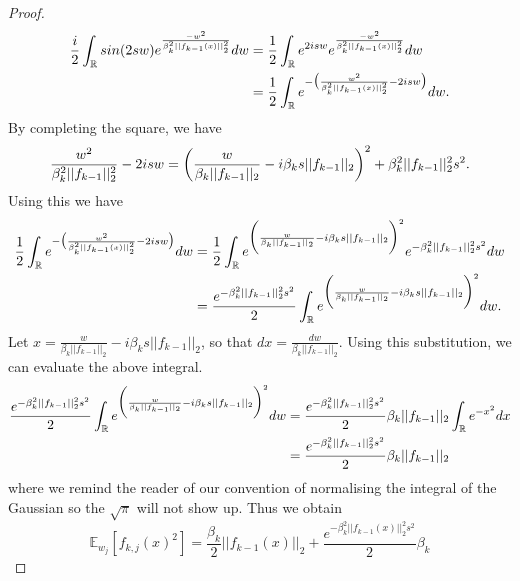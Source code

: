 \documentclass{article}
\theoremstyle{plain}
\theoremstyle{definition}
\theoremstyle{remark}
\newcommand\R{\mathbb{R}}
\begin{document}
\begin{proof}
\begin{align*}
	\frac{i}{2}\int_{\R}sin(2sw)
	e^{\frac{-w^2}{\beta_k^2\vert\vert f_{k-1}(x)\vert\vert_2^2}}dw &=
	\frac{1}{2}\int_{\R}e^{2isw}
	e^{\frac{-w^2}{\beta_k^2\vert\vert f_{k-1}(x)\vert\vert_2^2}}dw \\
	&=
	\frac{1}{2}\int_{\R}
	e^{-\big{(}\frac{w^2}{\beta_k^2\vert\vert f_{k-1}(x)\vert\vert_2^2} - 
	2isw\big{)}}dw.
\end{align*}
By completing the square, we have
\begin{equation}
	\frac{w^2}{\beta_k^2\vert\vert f_{k-1}\vert\vert^2_2} - 2isw = 
	\bigg{(} 
	\frac{w}{\beta_k\vert\vert f_{k-1}\vert\vert_2} - 
	i\beta_ks\vert\vert f_{k-1}\vert\vert_2	
	\bigg{)}^2 + \beta_k^2\vert\vert f_{k-1}\vert\vert^2_2s^2.
\end{equation}
Using this we have
\begin{align*}
\frac{1}{2}\int_{\R}
	e^{-\big{(}\frac{w^2}{\beta_k^2\vert\vert f_{k-1}(x)\vert\vert_2^2} - 
	2isw\big{)}}dw &= 
	\frac{1}{2}\int_{\R}e^{\bigg{(} 
	\frac{w}{\beta_k\vert\vert f_{k-1}\vert\vert_2} - 
	i\beta_ks\vert\vert f_{k-1}\vert\vert_2	
	\bigg{)}^2}e^{-\beta_k^2\vert\vert f_{k-1}\vert\vert^2_2s^2}dw \\
	&= 
	\frac{e^{-\beta_k^2\vert\vert f_{k-1}\vert\vert^2_2s^2}}{2}
	\int_{\R}
	e^{\bigg{(} 
	\frac{w}{\beta_k\vert\vert f_{k-1}\vert\vert_2} - 
	i\beta_ks\vert\vert f_{k-1}\vert\vert_2	
	\bigg{)}^2}dw.
\end{align*}
Let $x = \frac{w}{\beta_k\vert\vert f_{k-1}\vert\vert_2} - 
i\beta_ks\vert\vert f_{k-1}\vert\vert_2$, so that $dx = 
\frac{dw}{\beta_k\vert\vert f_{k-1}\vert\vert_2}$. Using this substitution, we 
can evaluate the above integral.
\begin{align*}
	\frac{e^{-\beta_k^2\vert\vert f_{k-1}\vert\vert^2_2s^2}}{2}
	\int_{\R}
	e^{\bigg{(} 
	\frac{w}{\beta_k\vert\vert f_{k-1}\vert\vert_2} - 
	i\beta_ks\vert\vert f_{k-1}\vert\vert_2	
	\bigg{)}^2}dw &=
	\frac{e^{-\beta_k^2\vert\vert f_{k-1}\vert\vert^2_2s^2}}{2}\beta_k
	\vert\vert f_{k-1}\vert\vert_2\int_{\R}e^{-x^2}dx \\
	&= 
	\frac{e^{-\beta_k^2\vert\vert f_{k-1}\vert\vert^2_2s^2}}{2}\beta_k
	\vert\vert f_{k-1}\vert\vert_2
\end{align*}
where we remind the reader of our convention of normalising the integral of the Gaussian so the $\sqrt{\pi}$ will not show up. Thus we obtain
\begin{equation*}
	\mathbb{E}_{w_j}[f_{k,j}(x)^2] = \frac{\beta_k}{2}
	\vert\vert f_{k-1}(x)\vert\vert_2 +
	\frac{e^{-\beta_k^2\vert\vert f_{k-1}(x)\vert\vert^2_2s^2}}{2}\beta_k

\end{equation*}
\end{proof}
\end{document}
